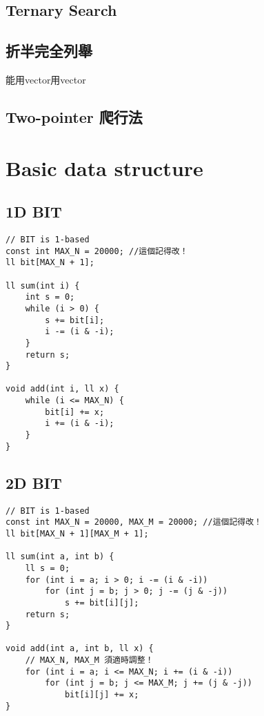 \documentclass[10pt,oneside]{article}
\begin{document}
\begin{landscape}
\begin{multicols}{2}
\subsection{Ternary Search}

\subsection{折半完全列舉}

能用vector用vector

\subsection{Two-pointer 爬行法}


\section{Basic data structure}

\subsection{1D BIT}

\begin{lstlisting}
// BIT is 1-based
const int MAX_N = 20000; //這個記得改！
ll bit[MAX_N + 1];

ll sum(int i) {
    int s = 0;
    while (i > 0) {
        s += bit[i];
        i -= (i & -i);
    }
    return s;
}

void add(int i, ll x) {
    while (i <= MAX_N) {
        bit[i] += x;
        i += (i & -i);
    }
}
\end{lstlisting}

\subsection{2D BIT}

\begin{lstlisting}
// BIT is 1-based
const int MAX_N = 20000, MAX_M = 20000; //這個記得改！
ll bit[MAX_N + 1][MAX_M + 1];

ll sum(int a, int b) {
    ll s = 0;
    for (int i = a; i > 0; i -= (i & -i))
        for (int j = b; j > 0; j -= (j & -j))
            s += bit[i][j];
    return s;
}

void add(int a, int b, ll x) {
	// MAX_N, MAX_M 須適時調整！
    for (int i = a; i <= MAX_N; i += (i & -i))
        for (int j = b; j <= MAX_M; j += (j & -j))
            bit[i][j] += x;
}
\end{lstlisting}


\end{multicols}
\end{landscape}
\end{document}
